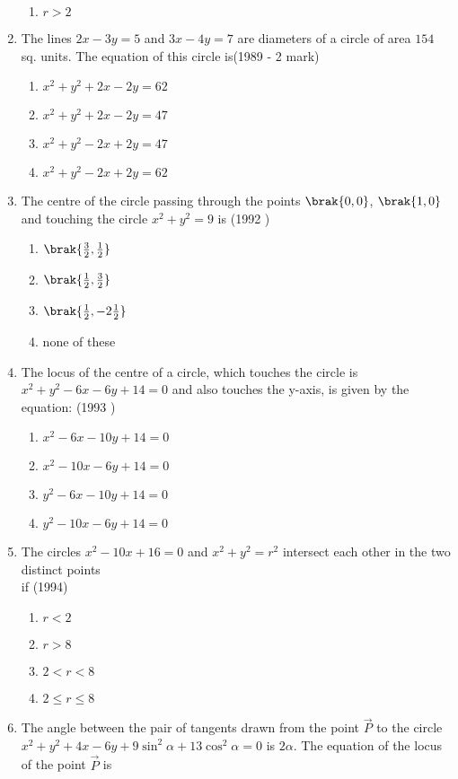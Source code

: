 \begin{enumerate}
\begin{enumerate}
    	\item $r>2$
    \end{enumerate}
    \item The lines $2x-3y=5$ and $3x-4y=7$ are diameters of a circle of area $154$ sq. units. The equation of this circle is\hfill {(1989 - 2 mark)}
    \begin{enumerate}
    	\item $x^{2}+y^{2}+2x-2y=62$
    	\item $x^{2}+y^{2}+2x-2y=47$
    	\item $x^{2}+y^{2}-2x+2y=47$
    	\item $x^{2}+y^{2}-2x+2y=62$
    \end{enumerate}
    \item The centre of the circle passing through the points $\brak{0, 0}$, $\brak{1, 0}$ and touching the circle $x^{2}+y^{2}=9$ is
    \hfill {(1992 )}
    \begin{enumerate}
    	\item $\brak{\frac{3}{2}, \frac{1}{2}}$
    	\item $\brak{\frac{1}{2}, \frac{3}{2}}$
    	\item $\brak{\frac{1}{2}, -2\frac{1}{2}}$
    	\item none of these
    \end{enumerate}
    \item The locus of the centre of a circle,  which touches the circle is $x^{2}+y^{2}-6x-6y+14=0$ and also touches the y-axis,  is given by the equation: \hfill {(1993 )}
    \begin{enumerate}
    	\item $x^{2}-6x-10y+14=0$
    	\item $x^{2}-10x-6y+14=0$
    	\item $y^{2}-6x-10y+14=0$
    	\item $y^{2}-10x-6y+14=0$
    \end{enumerate}
    \item The circles $x^{2}-10x+16=0$ and $x^{2}+y^{2}=r^{2}$ intersect each other in the two distinct points\\ if
    \hfill {(1994)}
    \begin{enumerate}
    	\item $r<2$
    	\item $r>8$
    	\item $2<r<8$
    	\item $2\leq r\leq8$
    \end{enumerate}
    \item The angle between the pair of tangents drawn from the point $\vec{P}$ to the circle $x^{2}+y^{2}+4x-6y+9\sin^{2}{\alpha}+13\cos^{2}{\alpha}=0$ is $2\alpha$. The equation of the locus of the point $\vec{P}$ is

\end{enumerate}
